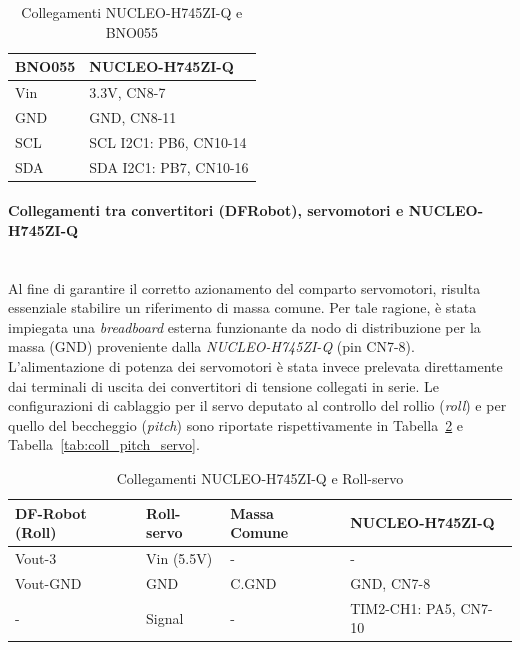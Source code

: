 \documentclass[11pt]{report}
\begin{document}
	\begin{table}[H]
		\centering
		\begin{tabular}{l l}
			\toprule
			\textbf{BNO055} & \textbf{NUCLEO-H745ZI-Q} \\
			\midrule
			Vin & 3.3V, CN8-7 \\
			GND & GND, CN8-11 \\
			SCL & SCL I2C1: PB6, CN10-14 \\
			SDA & SDA I2C1: PB7, CN10-16 \\
			\bottomrule
		\end{tabular}
		\caption{Collegamenti NUCLEO-H745ZI-Q e BNO055}
		\label{tab:coll_bno055}
	\end{table}
	
	\paragraph{Collegamenti tra convertitori (DFRobot), servomotori e NUCLEO-H745ZI-Q}\mbox{}\\
	Al fine di garantire il corretto azionamento del comparto servomotori, risulta essenziale stabilire un riferimento di massa comune. Per tale ragione, è stata impiegata una \textit{breadboard} esterna funzionante da nodo di distribuzione per la massa (GND) proveniente dalla \textit{NUCLEO-H745ZI-Q} (pin CN7-8). L'alimentazione di potenza dei servomotori è stata invece prelevata direttamente dai terminali di uscita dei convertitori di tensione collegati in serie. Le configurazioni di cablaggio per il servo deputato al controllo del rollio (\textit{roll}) e per quello del beccheggio (\textit{pitch}) sono riportate rispettivamente in Tabella~\ref{tab:coll_roll_servo} e Tabella~\ref{tab:coll_pitch_servo}.
	
	\begin{table}[H]
		\centering
		\begin{tabular}{l l l l}
			\toprule
			\textbf{DF-Robot (Roll)} & \textbf{Roll-servo} & \textbf{Massa Comune} & \textbf{NUCLEO-H745ZI-Q} \\
			\midrule
			Vout-3   & Vin (5.5V) & -    & - \\
			Vout-GND & GND        & C.GND & GND, CN7-8 \\
			-        & Signal     & -    & TIM2-CH1: PA5, CN7-10 \\
			\bottomrule
		\end{tabular}
		\caption{Collegamenti NUCLEO-H745ZI-Q e Roll-servo}
		\label{tab:coll_roll_servo}
	\end{table}
	
\end{document}
